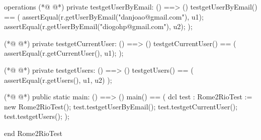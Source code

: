 \begin{vdmpp}[breaklines=true]
operations
(*@
\label{testgetUserByEmail:216}
@*)
  private testgetUserByEmail: () ==> ()
   testgetUserByEmail() == (
    assertEqual(r.getUserByEmail("danjoao@gmail.com"), u1);
    assertEqual(r.getUserByEmail("diogohp@gmail.com"), u2);
   );

(*@
\label{testgetCurrentUser:222}
@*)
   private testgetCurrentUser: () ==> ()
   testgetCurrentUser() == (
    assertEqual(r.getCurrentUser(), u1);
   );

(*@
\label{testgetUsers:227}
@*)
   private testgetUsers: () ==> ()
   testgetUsers() == (
    assertEqual(r.getUsers(), {u1, u2})
    );

(*@
\label{main:232}
@*)
 public static main: () ==> ()
      main() ==
      (
       dcl test : Rome2RioTest := new Rome2RioTest();
       test.testgetUserByEmail();
       test.testgetCurrentUser();
       test.testgetUsers();
       );

end Rome2RioTest
\end{vdmpp}

